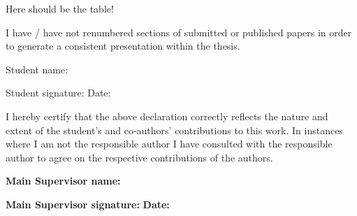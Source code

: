 {Here should be the table!

I have / have not renumbered sections of submitted or published papers
in order to generate a consistent presentation within the thesis.

Student name:

Student signature: Date:

I hereby certify that the above declaration correctly reflects the
nature and extent of the student's and co-authors' contributions to this
work. In instances where I am not the responsible author I have
consulted with the responsible author to agree on the respective
contributions of the authors.

\textbf{Main Supervisor name:}

\textbf{Main Supervisor signature:} \textbf{Date:}


}
